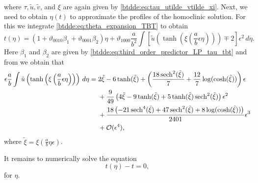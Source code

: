 where $\tau, \tilde u, \tilde v$, and $\xi$ are again given by \cref{btdde:eq:tau_utilde_vtilde_xi}.
Next, we need to obtain $\eta(t)$ to approximate the profiles of the homoclinic solution. For
this we integrate \cref{btdde:eq:theta_expansion_TBT} to obtain
\[
t(\eta) = \left(1  + \vartheta_{0010} \beta_1 + \vartheta_{0001} \beta_2 \right)\eta  + \vartheta_{1000} \frac a{b^2} \int \left[ \tilde {u}\left(\tanh\left(\xi\left(\frac{a}{b}\epsilon\eta\right)\right)\right) \mp 2 \right] \epsilon^2 \, d\eta.
\]
Here $\beta_1$ and $\beta_2$ are given by \cref{btdde:eq:third_order_predictor_LP_tau_tbt} and from \cite{Bosschaert@Interplay} we obtain that
\begin{equation}
\label{btdde:eq:int_u_s_regular_perturbation}
\begin{aligned}
\epsilon \frac a b \int
\tilde {u}\left(\tanh\left(\xi\left(\frac{a}{b}\epsilon\eta\right)\right)\right) \, d\eta
={}& 2 \tilde\xi -6 \tanh (\tilde\xi ) + 
     \left( \frac{18 \operatorname{sech}^2(\tilde\xi )}{7}+\frac{12}{7} \log (\cosh (\tilde\xi ))
		 \right) \epsilon \\ &+
		 \frac{9}{49} \left(4 \tilde\xi -9 \tanh (\tilde\xi )+5 \tanh (\tilde\xi ) \operatorname{sech}^2(\tilde\xi
		 )\right) \epsilon^2 \\ &+
		 \frac{18 \left(-21 \operatorname{sech}^4(\tilde\xi )+47 \operatorname{sech}^2(\tilde\xi )+8 \log (\cosh
		 (\tilde\xi ))\right)}{2401} \epsilon^3  \\
                                &+ \mathcal{O}(\epsilon^4),
\end{aligned}
\end{equation}
where $\tilde\xi = \xi(\frac{a}{b}\eta\epsilon)$. 

It remains to numerically solve the equation 
\begin{equation*}
    t(\eta) - t = 0,
\end{equation*}
for $\eta$.

